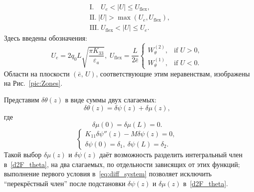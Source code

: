 \begin{equation}
\begin{split}
&\mathrm{I}.\quad U_e< \left|U\right| \leq U_\mathrm{flex},\\
&\mathrm{II}.\; \left|U\right|> \max( U_e, U_\mathrm{flex}),\\
&\mathrm{III}.\; U_\mathrm{flex}< \left|U\right| \leq U_e.
\end{split}
\label{eq:conditions_for_voltages}
\end{equation}
Здесь введены обозначения:
\begin{equation}\label{UfrUfl}
U_e =2 q_0 L \sqrt{\frac{\pi K_{33}}{\varepsilon_a}}, \;
U_\mathrm{flex}=
\frac{L}{2\bar{e}}
\begin{cases}
W_\theta^{(2)},&\!\! \text{if } U >0,\\
W_\theta^{(1)},&\!\!\text{if } U<0.
\end{cases}
\end{equation}
Области на плоскости $(\bar{e},\,U)$, соответствующие этим неравенствам, изображены на Рис.~\ref{pic:Zones}.

Представим $\delta \theta(z)$ в виде суммы двух слагаемых:
\begin{equation}\label{thetamupsi}
\delta\theta(z) = \delta\psi(z) + \delta\mu(z),
\end{equation}
где
\begin{equation}\label{mu0=muL=0}
\delta\mu(0) = \delta\mu(L) = 0.
\end{equation}
\begin{equation}
\begin{cases}
K_{11} \delta\psi''(z) - M\delta\psi(z) = 0,\\
\delta\psi(0) = \delta_1,\ \delta\psi(L) = \delta_2.
\end{cases}
\label{eq:diff_system}
\end{equation}
Такой выбор $\delta\mu(z)$ и $\delta\psi(z)$ даёт возможность разделить интегральный член в~\eqref{d2F_theta}, на два слагаемых, по отдельности зависящих от этих функций; выполнение первого условия в~\eqref{eq:diff_system} позволяет исключить ``перекрёстный член'' после подстановки $\delta\psi(z)$ и $\delta\mu(z)$ в~\eqref{d2F_theta}.

